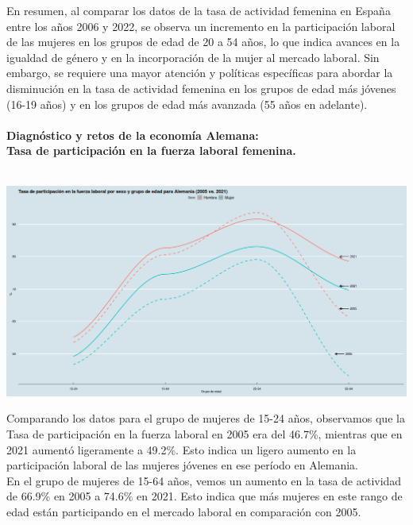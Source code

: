 En resumen, al comparar los datos de la tasa de actividad femenina en España entre los años 2006 y 2022, se observa un incremento en la participación laboral de las mujeres en los grupos de edad de 20 a 54 años, lo que indica avances en la igualdad de género y en la incorporación de la mujer al mercado laboral. Sin embargo, se requiere una mayor atención y políticas específicas para abordar la disminución en la tasa de actividad femenina en los grupos de edad más jóvenes (16-19 años) y en los grupos de edad más avanzada (55 años en adelante).\\\\



\textbf{Diagnóstico y retos de la economía Alemana:\\
	Tasa de participación en la fuerza laboral femenina.}\\\\

    \begin{center}
	\includegraphics[scale=.32]{image/b3ej1.png}
    \end{center}
    \vspace{.5cm}

Comparando los datos para el grupo de mujeres de 15-24 años, observamos que la Tasa de participación en la fuerza laboral en 2005 era del 46.7\%, mientras que en 2021 aumentó ligeramente a 49.2\%. Esto indica un ligero aumento en la participación laboral de las mujeres jóvenes en ese período en Alemania.\\

En el grupo de mujeres de 15-64 años, vemos un aumento en la tasa de actividad de 66.9\% en 2005 a 74.6\% en 2021. Esto indica que más mujeres en este rango de edad están participando en el mercado laboral en comparación con 2005.\\

